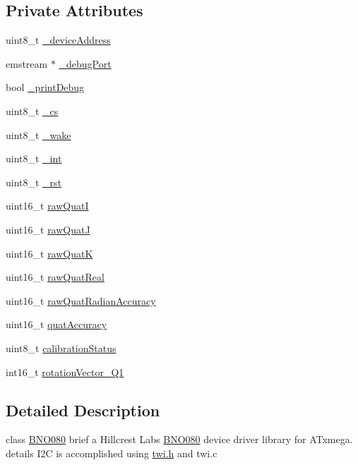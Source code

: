 \subsection*{Private Attributes}
\begin{DoxyCompactItemize}
\item 
uint8\+\_\+t \mbox{\hyperlink{classBNO080_a63b7d45588c001f20f020f2725c9631f}{\+\_\+device\+Address}}
\item 
emstream $\ast$ \mbox{\hyperlink{classBNO080_a433c3d711351932891cae82f59815c8c}{\+\_\+debug\+Port}}
\item 
bool \mbox{\hyperlink{classBNO080_afbc3eecdf2e4967684145d5f4bd49450}{\+\_\+print\+Debug}}
\item 
uint8\+\_\+t \mbox{\hyperlink{classBNO080_a29fabde57a85f8377dfda2d4c042ef1f}{\+\_\+cs}}
\item 
uint8\+\_\+t \mbox{\hyperlink{classBNO080_adfa4c13dfbead9b7775423204a4c867f}{\+\_\+wake}}
\item 
uint8\+\_\+t \mbox{\hyperlink{classBNO080_a8f2f224f4927b7dd1bfa5a3fcc74f570}{\+\_\+int}}
\item 
uint8\+\_\+t \mbox{\hyperlink{classBNO080_af610903c57d3d234a1371655bc0dc4c7}{\+\_\+rst}}
\item 
uint16\+\_\+t \mbox{\hyperlink{classBNO080_a43cf4f91fab63767e08bebcba9d510e8}{raw\+QuatI}}
\item 
uint16\+\_\+t \mbox{\hyperlink{classBNO080_a18a55be7e69460f8bcd35686b5ca0522}{raw\+QuatJ}}
\item 
uint16\+\_\+t \mbox{\hyperlink{classBNO080_aeb9ffda39fbb3993b0d6d65f87c49e17}{raw\+QuatK}}
\item 
uint16\+\_\+t \mbox{\hyperlink{classBNO080_a7d17a57aa32c285c2cdd242a36dde0c1}{raw\+Quat\+Real}}
\item 
uint16\+\_\+t \mbox{\hyperlink{classBNO080_a8a3948d98828f625f88ebe3fa5abf54a}{raw\+Quat\+Radian\+Accuracy}}
\item 
uint16\+\_\+t \mbox{\hyperlink{classBNO080_a7f87a203f54007c5944bb47efee549e0}{quat\+Accuracy}}
\item 
uint8\+\_\+t \mbox{\hyperlink{classBNO080_a28a086a0c24b22f469d0a6155bc5ad9f}{calibration\+Status}}
\item 
int16\+\_\+t \mbox{\hyperlink{classBNO080_a544161adfb515e0691064c13b34ea5cf}{rotation\+Vector\+\_\+\+Q1}}
\end{DoxyCompactItemize}


\subsection{Detailed Description}
class \mbox{\hyperlink{classBNO080}{B\+N\+O080}} brief a Hillcrest Labs \mbox{\hyperlink{classBNO080}{B\+N\+O080}} device driver library for A\+Txmega. details I2C is accomplished using \mbox{\hyperlink{twi_8h}{twi.\+h}} and twi.\+c 

